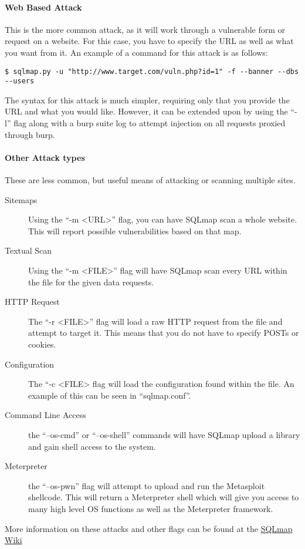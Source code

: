 			\paragraph{Web Based Attack}
				This is the more common attack, as it will work through a vulnerable form or request on a website. 
				For this case, you have to specify the URL as well as what you want from it. 
				An example of a command for this attack is as follows:
				\begin{lstlisting}[style=CLI]
					$ sqlmap.py -u "http://www.target.com/vuln.php?id=1" -f --banner --dbs --users
				\end{lstlisting}

				The syntax for this attack is much simpler, requiring only that you provide the URL and what you would like. 
				However, it can be extended upon by using the ``-l'' flag along with a burp suite log to attempt injection on all requests proxied through burp. 

			\paragraph{Other Attack types}
				These are less common, but useful means of attacking or scanning multiple sites. 
				\begin{description}
					\item[Sitemaps] Using the ``-m <URL>'' flag, you can have SQLmap scan a whole website. 
						This will report possible vulnerabilities based on that map. 
					\item[Textual Scan] Using the ``-m <FILE>'' flag will have SQLmap scan every URL within the file for the given data requests. 
					\item[HTTP Request] The ``-r <FILE>'' flag will load a raw HTTP request from the file and attempt to target it. 
						This means that you do not have to specify POSTs or cookies. 
					\item[Configuration] The ``-c <FILE> flag will load the configuration found within the file. 
						An example of this can be seen in ``sqlmap.conf''. 
					\item[Command Line Access] the ``--os-cmd'' or ``--os-shell'' commands will have SQLmap upload a library and gain shell access to the system. 
					\item[Meterpreter] the ``--os-pwn'' flag will attempt to upload and run the Metasploit shellcode. 
						This will return a Meterpreter shell which will give you access to many high level OS functions as well as the Meterpreter framework. 
				\end{description}
				More information on these attacks and other flags can be found at the \href{https://github.com/sqlmapproject/sqlmap/wiki}{SQLmap Wiki}
